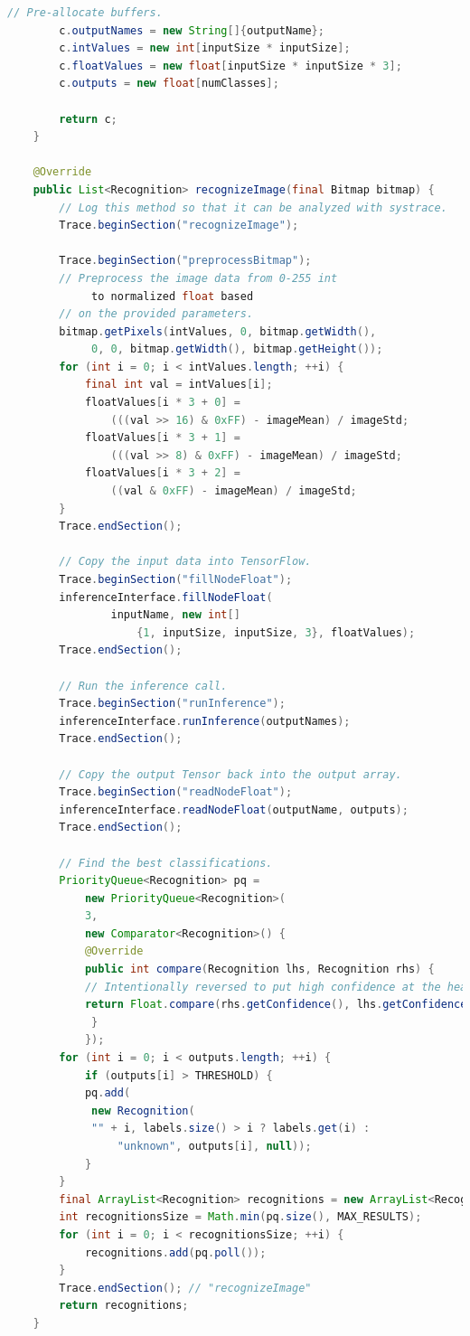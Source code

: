 \documentclass[UTF8, Microsoft YaHei]{book}
\begin{document}
\begin{small}
\begin{lstlisting}[language=java]
        // Pre-allocate buffers.
        c.outputNames = new String[]{outputName};
        c.intValues = new int[inputSize * inputSize];
        c.floatValues = new float[inputSize * inputSize * 3];
        c.outputs = new float[numClasses];

        return c;
    }

    @Override
    public List<Recognition> recognizeImage(final Bitmap bitmap) {
        // Log this method so that it can be analyzed with systrace.
        Trace.beginSection("recognizeImage");

        Trace.beginSection("preprocessBitmap");
        // Preprocess the image data from 0-255 int
        	 to normalized float based
        // on the provided parameters.
        bitmap.getPixels(intValues, 0, bitmap.getWidth(),
        	 0, 0, bitmap.getWidth(), bitmap.getHeight());
        for (int i = 0; i < intValues.length; ++i) {
            final int val = intValues[i];
            floatValues[i * 3 + 0] =
            	(((val >> 16) & 0xFF) - imageMean) / imageStd;
            floatValues[i * 3 + 1] =
            	(((val >> 8) & 0xFF) - imageMean) / imageStd;
            floatValues[i * 3 + 2] =
            	((val & 0xFF) - imageMean) / imageStd;
        }
        Trace.endSection();

        // Copy the input data into TensorFlow.
        Trace.beginSection("fillNodeFloat");
        inferenceInterface.fillNodeFloat(
                inputName, new int[]
                	{1, inputSize, inputSize, 3}, floatValues);
        Trace.endSection();

        // Run the inference call.
        Trace.beginSection("runInference");
        inferenceInterface.runInference(outputNames);
        Trace.endSection();

        // Copy the output Tensor back into the output array.
        Trace.beginSection("readNodeFloat");
        inferenceInterface.readNodeFloat(outputName, outputs);
        Trace.endSection();

        // Find the best classifications.
        PriorityQueue<Recognition> pq =
            new PriorityQueue<Recognition>(
            3,
            new Comparator<Recognition>() {
            @Override
            public int compare(Recognition lhs, Recognition rhs) {
            // Intentionally reversed to put high confidence at the head of the queue.
            return Float.compare(rhs.getConfidence(), lhs.getConfidence());
             }
            });
        for (int i = 0; i < outputs.length; ++i) {
            if (outputs[i] > THRESHOLD) {
            pq.add(
             new Recognition(
             "" + i, labels.size() > i ? labels.get(i) :
             	 "unknown", outputs[i], null));
            }
        }
        final ArrayList<Recognition> recognitions = new ArrayList<Recognition>();
        int recognitionsSize = Math.min(pq.size(), MAX_RESULTS);
        for (int i = 0; i < recognitionsSize; ++i) {
            recognitions.add(pq.poll());
        }
        Trace.endSection(); // "recognizeImage"
        return recognitions;
    }


\end{lstlisting}
\end{small}
\end{document}
